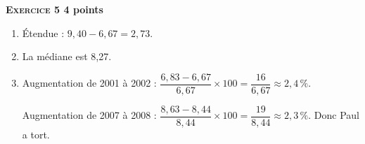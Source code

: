 \textbf{\textsc{Exercice 5} \hfill 4 points}

\medskip

\begin{enumerate}
\item Étendue : $9,40 - 6,67 = 2,73$.
\item La médiane est 8,27.
\item Augmentation de 2001 à 2002 : $\dfrac{6,83 - 6,67}{6,67} \times 100 = \dfrac{16}{6,67} \approx 2,4\,\%$.

Augmentation de 2007 à 2008 : $\dfrac{8,63 - 8,44}{8,44} \times 100 = \dfrac{19}{8,44} \approx 2,3\,\%$. Donc Paul a tort.
\end{enumerate}

\medskip

